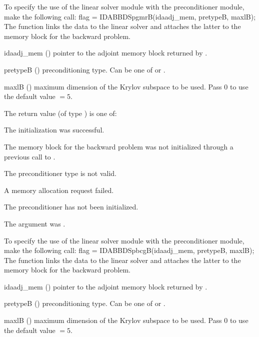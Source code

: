 {}
To specify the use of the {\idaspgmr} linear solver module with the {\idabbdpre} 
preconditioner module, make the following call:
{
  flag = IDABBDSpgmrB(idaadj\_mem, pretypeB, maxlB);
}
{
  The function  links the {\idabbdpre} data to the
  {\idaspgmr} linear solver and attaches the latter to the {\idas}
  memory block for the backward problem.
}
{
  \begin{args}
  \item[idaadj\_mem] ()
    pointer to the adjoint memory block returned by .
  \item[pretypeB] ()
    preconditioning type. Can be one of  or .
  \item[maxlB] ()
    maximum dimension of the Krylov subspace to be used. Pass $0$ to use the 
    default value $=5$.
  \end{args}
}
{
  The return value  (of type ) is one of:
  \begin{args}
  \item[\Id{IDASPILS\_SUCCESS}] 
    The {\idaspgmr} initialization was successful.
  \item[\Id{IDASPILS\_MEM\_NULL}]
    The {\idas} memory block for the backward problem was not initialized through a 
    previous call to .
  \item[\Id{IDASPILS\_ILL\_INPUT}]
    The preconditioner type  is not valid.
  \item[\Id{IDASPILS\_MEM\_FAIL}]
    A memory allocation request failed.
  \item[\Id{IDABBDPRE\_PDATA\_NULL}]
    The {\idabbdpre} preconditioner has not been initialized.
  \item[\Id{IDABBDPRE\_ADJMEM\_NULL}]
    The  argument was .
  \end{args}
}
{}
To specify the use of the {\idaspbcg} linear solver module with the {\idabbdpre} 
preconditioner module, make the following call:
{
  flag = IDABBDSpbcgB(idaadj\_mem, pretypeB, maxlB);
}
{
  The function  links the {\idabbdpre} data to the
  {\idaspbcg} linear solver and attaches the latter to the {\idas}
  memory block for the backward problem.
}
{
  \begin{args}
  \item[idaadj\_mem] ()
    pointer to the adjoint memory block returned by .
  \item[pretypeB] ()
    preconditioning type. Can be one of  or .
  \item[maxlB] ()
    maximum dimension of the Krylov subspace to be used. Pass $0$ to use the 
    default value $=5$.
  \end{args}
}
